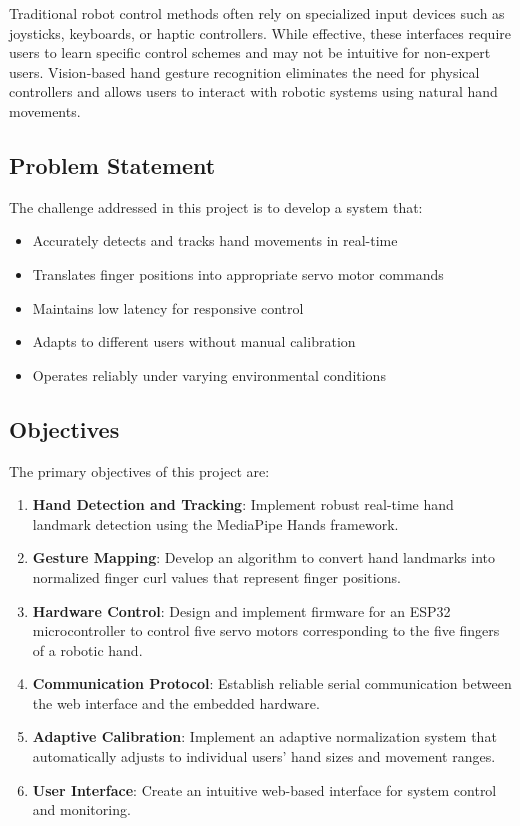 \documentclass[12pt]{article}
\begin{document}
Traditional robot control methods often rely on specialized input devices such as joysticks, keyboards, or haptic controllers. While effective, these interfaces require users to learn specific control schemes and may not be intuitive for non-expert users. Vision-based hand gesture recognition eliminates the need for physical controllers and allows users to interact with robotic systems using natural hand movements.

\subsection{Problem Statement}

The challenge addressed in this project is to develop a system that:
\begin{itemize}
    \item Accurately detects and tracks hand movements in real-time
    \item Translates finger positions into appropriate servo motor commands
    \item Maintains low latency for responsive control
    \item Adapts to different users without manual calibration
    \item Operates reliably under varying environmental conditions
\end{itemize}

\subsection{Objectives}

The primary objectives of this project are:

\begin{enumerate}
    \item \textbf{Hand Detection and Tracking}: Implement robust real-time hand landmark detection using the MediaPipe Hands framework.
    \item \textbf{Gesture Mapping}: Develop an algorithm to convert hand landmarks into normalized finger curl values that represent finger positions.
    \item \textbf{Hardware Control}: Design and implement firmware for an ESP32 microcontroller to control five servo motors corresponding to the five fingers of a robotic hand.
    \item \textbf{Communication Protocol}: Establish reliable serial communication between the web interface and the embedded hardware.
    \item \textbf{Adaptive Calibration}: Implement an adaptive normalization system that automatically adjusts to individual users' hand sizes and movement ranges.
    \item \textbf{User Interface}: Create an intuitive web-based interface for system control and monitoring.
\end{enumerate}
\end{document}
